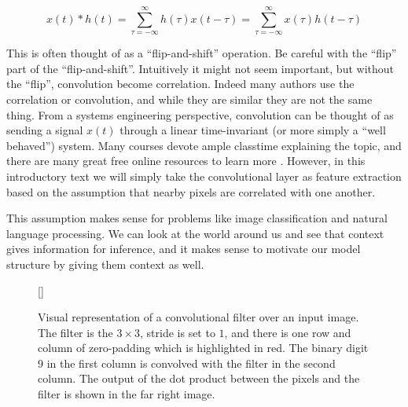 \message{ !name(main.tex)}\documentclass[11pt]{article}
\begin{document}
\begin{equation} \label{eq:conv_def}
  x(t) * h(t) = \sum_{\tau=-\infty}^{\infty}h(\tau)x(t-\tau) = \sum_{\tau=-\infty}^{\infty}x(\tau)h(t-\tau)
\end{equation}

This is often thought of as a ``flip-and-shift'' operation. Be careful with the ``flip'' part of the ``flip-and-shift''. Intuitively it might not seem important, but without the ``flip'', convolution become correlation. Indeed many authors use the correlation or convolution, and while they are similar they are not the same thing. From a systems engineering perspective, convolution can be thought of as sending a signal $x(t)$ through a linear time-invariant (or more simply a ``well behaved'') system. Many courses devote ample classtime explaining the topic, and there are many great free online resources to learn more \cite{joyofconv}. However, in this introductory text we will simply take the convolutional layer as feature extraction based on the assumption that nearby pixels are correlated with one another. 

This assumption makes sense for problems like image classification and natural language processing. We can look at the world around us and see that context gives information for inference, and it makes sense to motivate our model structure by giving them context as well. 

\begin{figure}[H]
  [\FBwidth]
  {\caption{Visual representation of a convolutional filter over an input image. The filter is the $3\times3$, stride is set to $1$, and there is one row and column of zero-padding which is highlighted in red. The binary digit $9$ in the first column is convolved with the filter in the second column. The output of the dot product between the pixels and the filter is shown in the far right image.}\label{fig:conv_ex}}{}
\end{figure}
\end{document}
